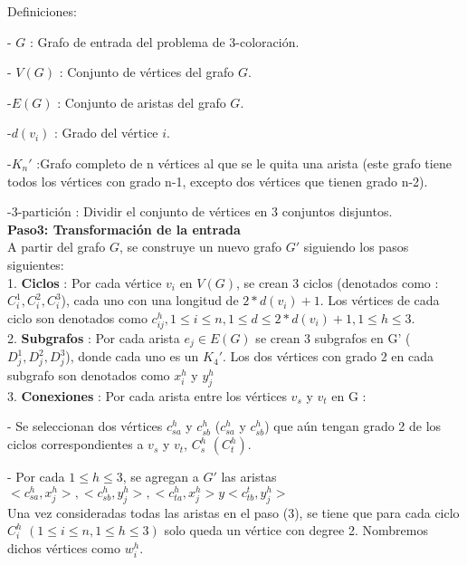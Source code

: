 \documentclass[
10pt, %
a4paper, %
oneside, %
headinclude,footinclude, %
BCOR5mm, %
]{scrartcl}
\begin{document}
Definiciones:

- $G$ : Grafo de entrada del problema de 3-coloración.

- $V(G)$ : Conjunto de vértices del grafo $G$.

-$E(G)$ : Conjunto de aristas del grafo $G$. 

-$d(v_i)$ : Grado del vértice $i$.

-$K_n'$ :Grafo completo de n vértices al que se le quita una arista (este grafo tiene todos los vértices con grado n-1, excepto dos vértices que tienen grado n-2).

-3-partición : Dividir el conjunto de vértices en 3 conjuntos disjuntos.\\



\textbf{Paso3: Transformación de la entrada  }\\

A partir del grafo $G$, se construye un nuevo grafo $G'$ siguiendo los pasos siguientes:\\

1. \textbf{Ciclos} : Por cada vértice $v_i$ en $V(G)$, se crean 3 ciclos (denotados como : $C^1_i, C^2_i, C^3_i$), 
cada uno con una longitud de $2*d(v_i) + 1$. Los vértices de cada ciclo son denotados como $c_{ij}^{h} , 1 \leq i \leq n , 1 \leq d \leq 2*d(v_i) + 1 , 1 \leq h \leq 3 $.\\

2. \textbf{Subgrafos} : Por cada arista $e_j \in E(G)$ se crean 3 subgrafos en G' ($D^1_j, D^2_j, D^3_j$), donde cada uno es un $K_4'$. Los dos vértices con grado 2 en cada 
subgrafo son denotados como $x^h_i$ y $y^h_j$\\

3. \textbf{Conexiones} : Por cada arista entre los vértices $v_s$ y $v_t$ en G :

- Se seleccionan dos vértices $c_{sa}^{h}$ y $c_{sb}^{h}$ ($c_{sa}^{h}$ y $c_{sb}^{h}$) que aún tengan grado 2 de los ciclos correspondientes a $v_s$ y $v_t$, $C^h_s$ $(C^h_t)$.

- Por cada $1\leq h \leq 3$, se agregan a $G'$ las aristas $<c_{sa}^{h},x^h_j> , <c_{sb}^{h},y^h_j> , <c_{ta}^{h},x^h_j>  y <c_{tb}^{t}, y^h_j >$\\

Una vez consideradas todas las aristas en
el paso (3), se tiene que para cada ciclo $C^h_i$ $( 1\leq i \leq n, 1 \leq h \leq 3 )$ solo queda un vértice con degree 2. Nombremos
dichos vértices como $w^h_i$.\\
\end{document}
